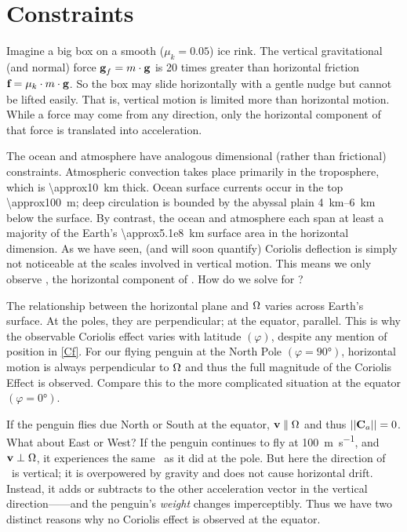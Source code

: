 \section{Constraints}
Imagine a big box on a smooth ($\mu_k=0.05$) ice rink. The vertical gravitational (and normal) force $\textbf{g}_f=m\cdot\textbf{g}$ is \num{20} times greater than horizontal friction $\textbf{f}=\mu_k\cdot m\cdot\textbf{g}$. So the box may slide horizontally with a gentle nudge but cannot be lifted easily. That is, vertical motion is limited more than horizontal motion. While a force may come from any direction, only the horizontal component of that force is translated into acceleration.
 
The ocean and atmosphere have analogous dimensional (rather than frictional) constraints. Atmospheric convection takes place primarily in the troposphere, which is \qty{\approx10}{\km} thick. Ocean surface currents occur in the top \qty{\approx100}{\m}; deep circulation is bounded by the abyssal plain \qtyrange{4}{6}{\km} below the surface. By contrast, the ocean and atmosphere each span at least a majority of the Earth's \qty{\approx5.1e8}{\km} surface area in the horizontal dimension. As we have seen, (and will soon quantify) Coriolis deflection is simply not noticeable at the scales involved in vertical motion. This means we only observe \vCah, the horizontal component of \vCa. How do we solve for \vCah?

The relationship between the horizontal plane and $\Omega$ varies across Earth's surface. At the poles, they are perpendicular; at the equator, parallel. This is why the observable Coriolis effect varies with latitude $(\varphi)$, despite any mention of position in \cref{Cf}. For our flying penguin at the North Pole $(\varphi=\ang{90})$, horizontal motion is always perpendicular to $\Omega$ and thus the full magnitude of the Coriolis Effect is observed. Compare this to the more complicated situation at the equator $(\varphi=\ang{0})$.

If the penguin flies due North or South at the equator, $\textbf{v}\parallel\Omega$ and thus $||\textbf{C$_a$}||=0$. What about East or West? If the penguin continues to fly at \qty{100}{\meter\per\second}, and $\textbf{v}\perp\Omega$, it experiences the same \vCa\ as it did at the pole. But here the direction of \vCa\ is vertical; it is overpowered by gravity and does not cause horizontal drift. Instead, it adds or subtracts to the other acceleration vector in the vertical direction---\vg---and the penguin's \emph{weight} changes imperceptibly. Thus we have two distinct reasons why no Coriolis effect is observed at the equator.

